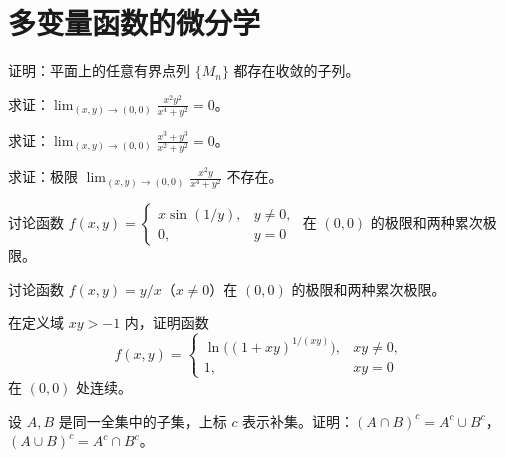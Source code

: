 \renewcommand{\thesection}{\arabic{section}}\renewcommand{\theHsection}{chapter.\arabic{section}}\setcounter{section}{8}\section{多变量函数的微分学}
\noindent\begin{minipage}{\textwidth}
证明：平面上的任意有界点列 $\{M_n\}$ 都存在收敛的子列。
\end{minipage}\par\vfill
\noindent\begin{minipage}{\textwidth}
求证：$\displaystyle\lim_{(x,y)\to(0,0)}\frac{x^2y^2}{x^4+y^2}=0$。
\end{minipage}\par\vfill
\noindent\begin{minipage}{\textwidth}
求证：$\displaystyle\lim_{(x,y)\to(0,0)}\frac{x^3+y^3}{x^2+y^2}=0$。
\end{minipage}\par\vfill
\noindent\begin{minipage}{\textwidth}
求证：极限 $\displaystyle\lim_{(x,y)\to(0,0)}\frac{x^2y}{x^4+y^2}$ 不存在。
\end{minipage}\par\vfill
\newpage
\noindent\begin{minipage}{\textwidth}
讨论函数 $f(x,y)=\begin{cases}x\sin(1/y),&y\ne0,\\0,&y=0\end{cases}$ 在 $(0,0)$ 的极限和两种累次极限。
\end{minipage}\par\vfill
\noindent\begin{minipage}{\textwidth}
讨论函数 $f(x,y)=y/x$（$x\ne0$）在 $(0,0)$ 的极限和两种累次极限。
\end{minipage}\par\vfill
\noindent\begin{minipage}{\textwidth}
在定义域 $xy>-1$ 内，证明函数 \[f(x,y)=\begin{cases}\ln\bigl((1+xy)^{1/(xy)}\bigr),&xy\ne0,\\1,&xy=0\end{cases}\] 在 $(0,0)$ 处连续。
\end{minipage}\par\vfill
\noindent\begin{minipage}{\textwidth}
设 $A,B$ 是同一全集中的子集，上标 $c$ 表示补集。证明：$(A\cap B)^c=A^c\cup B^c$，$(A\cup B)^c=A^c\cap B^c$。
\end{minipage}\par\vfill
